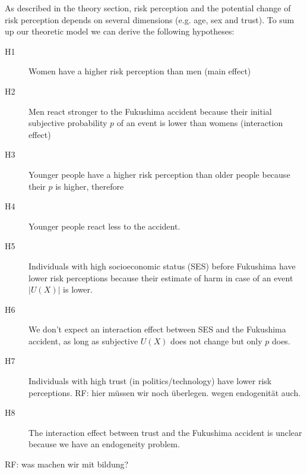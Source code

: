 {As described in the theory section, risk perception and the potential change of risk perception depends on several dimensions (e.g. age, sex and trust). To sum up our theoretic model we can derive the following hypotheses:

\begin{description}
\item [H1] Women have a higher risk perception than men (main effect)
\item [H2] Men react stronger to the Fukushima accident because their initial subjective probability $p$ of an event is lower than womens (interaction effect)
\item [H3] Younger people have a higher risk perception than older people because their $p$ is higher, therefore
\item [H4] Younger people react less to the accident.
\item [H5] Individuals with high socioeconomic status (SES) before Fukushima have lower risk perceptions because their estimate of harm in case of an event $|U(X)|$ is lower.
\item [H6] We don't expect an interaction effect between SES and the Fukushima accident, as long as subjective $U(X)$ does not change but only $p$ does.
\item [H7] Individuals with high trust (in politics/technology) have lower risk perceptions. RF: hier müssen wir noch überlegen. wegen endogenität auch.
\item [H8] The interaction effect between trust and the Fukushima accident is unclear because we have an endogeneity problem.
\end{description}
RF: was machen wir mit bildung?





}
